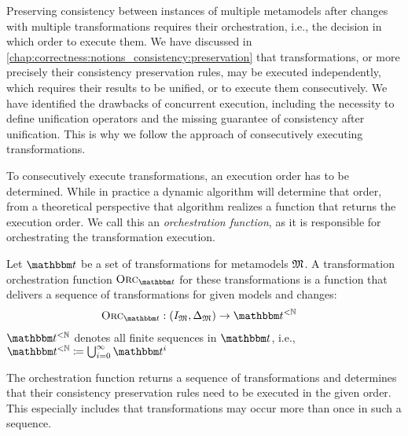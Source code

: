 Preserving consistency between instances of multiple metamodels after changes with multiple transformations requires their orchestration, i.e., the decision in which order to execute them.
We have discussed in \autoref{chap:correctness:notions_consistency:preservation} that transformations, or more precisely their consistency preservation rules, may be executed independently, which requires their results to be unified, or to execute them consecutively.
We have identified the drawbacks of concurrent execution, including the necessity to define unification operators and the missing guarantee of consistency after unification.
This is why we follow the approach of consecutively executing transformations.

To consecutively execute transformations, an execution order has to be determined.
While in practice a dynamic algorithm will determine that order, from a theoretical perspective that algorithm realizes a function that returns the execution order.
We call this an \emph{orchestration function}, as it is responsible for orchestrating the transformation execution.

\begin{definition} \label{def:orchestrationfunction}
    Let $\transformationset{T}$ be a set of transformations for metamodels $\metamodeltuple{M}$.
    A transformation orchestration function $\orcfunction{\transformationset{T}}$ for these transformations is a function that delivers a sequence of transformations for given models and changes:
    \begin{align*}
        &
        \orcfunction{\transformationset{T}} : (\metamodeltupleinstanceset{M}, \changeuniverse{\metamodeltuple{M}}) \rightarrow \transformationset{T}^{< \mathbb{N}}
    \end{align*}
    $\transformationset{T}^{< \mathbb{N}}$ denotes all finite sequences in $\transformationset{T}$, i.e., $\transformationset{T}^{< \mathbb{N}} \equalsperdefinition \bigcup_{i=0}^{\infty} \transformationset{T}^i$
\end{definition}

The orchestration function returns a sequence of transformations and determines that their consistency preservation rules need to be executed in the given order. 
This especially includes that transformations may occur more than once in such a sequence.

